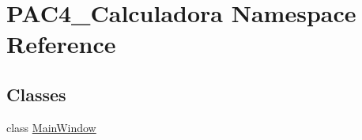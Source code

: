 \hypertarget{namespace_p_a_c4___calculadora}{}\section{P\+A\+C4\+\_\+\+Calculadora Namespace Reference}
\label{namespace_p_a_c4___calculadora}
\subsection*{Classes}
\begin{DoxyCompactItemize}
\item 
class \mbox{\hyperlink{class_p_a_c4___calculadora_1_1_main_window}{Main\+Window}}
\end{DoxyCompactItemize}
